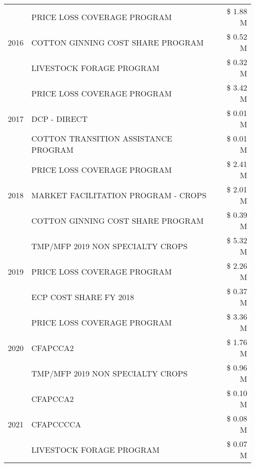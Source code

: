 \begin{tabular}{llr}
\multirow[t]{3}{*}{2016} & PRICE LOSS COVERAGE PROGRAM & \$ 1.88 M \\
 & COTTON GINNING COST SHARE PROGRAM & \$ 0.52 M \\
 & LIVESTOCK FORAGE PROGRAM & \$ 0.32 M \\
\cline{1-3}
\multirow[t]{3}{*}{2017} & PRICE LOSS COVERAGE PROGRAM & \$ 3.42 M \\
 & DCP - DIRECT & \$ 0.01 M \\
 & COTTON TRANSITION ASSISTANCE PROGRAM & \$ 0.01 M \\
\cline{1-3}
\multirow[t]{3}{*}{2018} & PRICE LOSS COVERAGE PROGRAM & \$ 2.41 M \\
 & MARKET FACILITATION PROGRAM - CROPS & \$ 2.01 M \\
 & COTTON GINNING COST SHARE PROGRAM & \$ 0.39 M \\
\cline{1-3}
\multirow[t]{3}{*}{2019} & TMP/MFP 2019 NON SPECIALTY CROPS & \$ 5.32 M \\
 & PRICE LOSS COVERAGE PROGRAM & \$ 2.26 M \\
 & ECP COST SHARE FY 2018 & \$ 0.37 M \\
\cline{1-3}
\multirow[t]{3}{*}{2020} & PRICE LOSS COVERAGE PROGRAM & \$ 3.36 M \\
 & CFAPCCA2 & \$ 1.76 M \\
 & TMP/MFP 2019 NON SPECIALTY CROPS & \$ 0.96 M \\
\cline{1-3}
\multirow[t]{3}{*}{2021} & CFAPCCA2 & \$ 0.10 M \\
 & CFAPCCCCA & \$ 0.08 M \\
 & LIVESTOCK FORAGE PROGRAM & \$ 0.07 M \\
\cline{1-3}
\bottomrule
\end{tabular}

